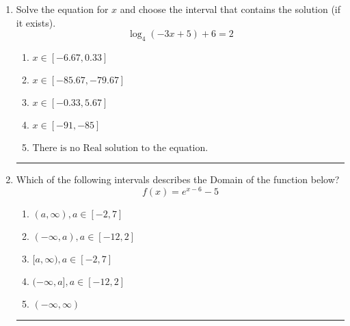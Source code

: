 \documentclass[14pt]{extbook}
\newcommand{\litem}[1]{\item#1\hspace*{-1cm}\rule{\textwidth}{0.4pt}}
\begin{document}
\begin{enumerate}
{\begin{enumerate}[label=\Alph*.]
\end{enumerate} }
\litem{
Solve the equation for $x$ and choose the interval that contains the solution (if it exists).\[ \log_{4}{(-3x+5)}+6 = 2 \]\begin{enumerate}[label=\Alph*.]
\item \( x \in [-6.67, 0.33] \)
\item \( x \in [-85.67, -79.67] \)
\item \( x \in [-0.33, 5.67] \)
\item \( x \in [-91, -85] \)
\item \( \text{There is no Real solution to the equation.} \)

\end{enumerate} }
\litem{
Which of the following intervals describes the Domain of the function below?\[ f(x) = e^{x-6}-5 \]\begin{enumerate}[label=\Alph*.]
\item \( (a, \infty), a \in [-2, 7] \)
\item \( (-\infty, a), a \in [-12, 2] \)
\item \( [a, \infty), a \in [-2, 7] \)
\item \( (-\infty, a], a \in [-12, 2] \)
\item \( (-\infty, \infty) \)

\end{enumerate} }
\end{enumerate}
\end{document}
